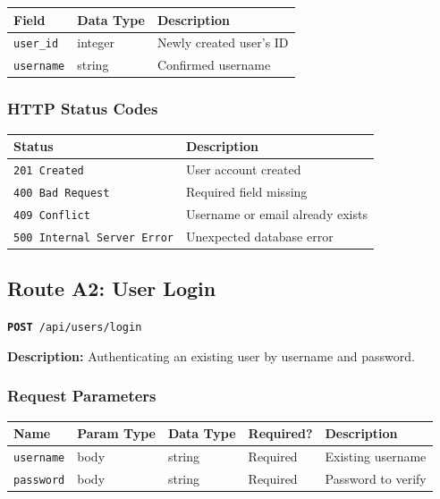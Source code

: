 \documentclass[11pt]{article}
\newcommand{\route}[2]{\texttt{\textcolor{routecolor}{\textbf{#1}}~#2}}
\begin{document}
\begin{center}
\small
\begin{tabular}{l l p{7cm}}
\toprule
\textbf{Field} & \textbf{Data Type} & \textbf{Description} \\
\midrule
\texttt{user\_id}  & integer & Newly created user's ID \\
\texttt{username}  & string  & Confirmed username \\
\bottomrule
\end{tabular}
\end{center}

\subsubsection*{HTTP Status Codes}

\begin{center}
\small
\begin{tabular}{l p{8cm}}
\toprule
\textbf{Status} & \textbf{Description} \\
\midrule
\texttt{201 Created} & User account created \\
\texttt{400 Bad Request} & Required field missing \\
\texttt{409 Conflict} & Username or email already exists \\
\texttt{500 Internal Server Error} & Unexpected database error \\
\bottomrule
\end{tabular}
\end{center}

\newpage
\subsection{Route A2: User Login}

\route{POST}{/api/users/login}

\medskip\noindent
\textbf{Description:} Authenticating an existing user by username and password.

\subsubsection*{Request Parameters}

\begin{center}
\small
\begin{tabular}{l l l l p{5cm}}
\toprule
\textbf{Name} & \textbf{Param Type} & \textbf{Data Type} & \textbf{Required?} & \textbf{Description} \\
\midrule
\texttt{username} & body & string & Required & Existing username \\
\texttt{password} & body & string & Required & Password to verify \\
\bottomrule
\end{tabular}
\end{center}
\end{document}
